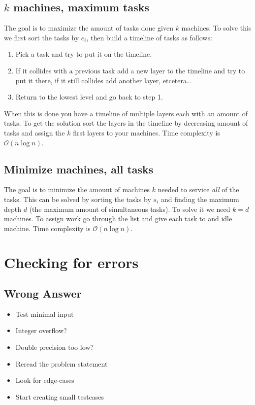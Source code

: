 \documentclass[8pt,a4paper,landscape,oneside]{amsart}
\newcommand{\bigO}{\mathcal{O}}
\begin{document}
\begin{multicols*}{3}
  \subsection{$k$ machines, maximum tasks}
  The goal is to maximize the amount of tasks done given $k$ machines. To solve this we first sort the tasks by $e_i$, then build a timeline of tasks as follows:
  \begin{enumerate}
    \item Pick a task and try to put it on the timeline.
    \item If it collides with a previous task add a new layer to the timeline and try to put it there, if it still collides add another layer, etcetera\ldots
    \item Return to the lowest level and go back to step 1.
  \end{enumerate}
  When this is done you have a timeline of multiple layers each with an amount of tasks. To get the solution sort the layers in the timeline by decreasing amount of tasks and assign the $k$ first layers to your machines. Time complexity is $\bigO(n\log n)$.
  
  \subsection{Minimize machines, all tasks}
  The goal is to minimize the amount of machines $k$ needed to service \emph{all} of the tasks. This can be solved by sorting the tasks by $s_i$ and finding the maximum depth $d$ (the maximum amount of simultaneous tasks). To solve it we need $k=d$ machines. To assign work go through the list and give each task to and idle machine.  Time complexity is $\bigO(n\log n)$.
        
        
\section{Checking for errors}
  \subsection{Wrong Answer}
    \begin{itemize}
    \item Test minimal input
    \item Integer overflow?
    \item Double precision too low?
    \item Reread the problem statement
    \item Look for edge-cases
    \item Start creating small testcases
    \end{itemize}

\end{multicols*}
\end{document}
